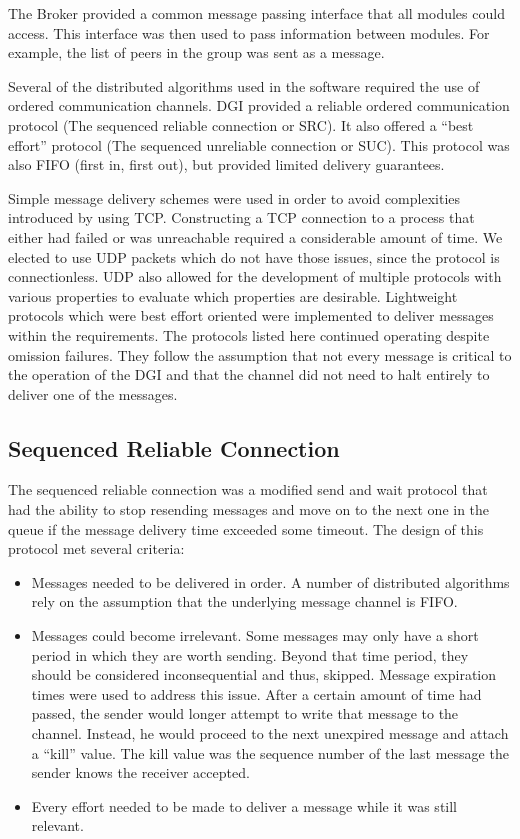 The Broker provided a common message passing interface that all modules could access.
This interface was then used to pass information between modules. 
For example, the list of peers in the group was sent as a message. 

Several of the distributed algorithms used in the software required the use of ordered communication channels.
DGI provided a reliable ordered communication protocol (The sequenced reliable connection or SRC).
It also offered a ``best effort'' protocol (The sequenced unreliable connection or SUC).
This protocol was also FIFO (first in, first out), but provided limited delivery guarantees.

Simple message delivery schemes were used in order to avoid complexities introduced by using TCP.
Constructing a TCP connection to a process that either had failed or was unreachable required a considerable amount of time.
We elected to use UDP packets which do not have those issues, since the protocol is connectionless.
UDP also allowed for the development of multiple protocols with various properties to evaluate which properties are desirable.
Lightweight protocols which were best effort oriented were implemented to deliver messages within the requirements.
The protocols listed here continued operating despite omission failures.
They follow the assumption that not every message is critical to the operation of the DGI and that the channel did not need to halt entirely to deliver one of the messages.

\subsection{Sequenced Reliable Connection}
The sequenced reliable connection was a modified send and wait protocol that had the ability to stop resending messages and move on to the next one in the queue if the message delivery time exceeded some timeout. 
The design of this protocol met several criteria:

\begin{itemize}
\item Messages needed to be delivered in order. A number of distributed algorithms rely on the assumption that the underlying message channel is FIFO.
\item Messages could become irrelevant.
Some messages may only have a short period in which they are worth sending. 
Beyond that time period, they should be considered inconsequential and thus, skipped.
Message expiration times were used to address this issue.
After a certain amount of time had passed, the sender would longer attempt to write that message to the channel.
Instead, he would proceed to the next unexpired message and attach a ``kill'' value. 
The kill value was the sequence number of the last message the sender knows the receiver accepted.
\item Every effort needed to be made to deliver a message while it was still relevant.
\end{itemize}

